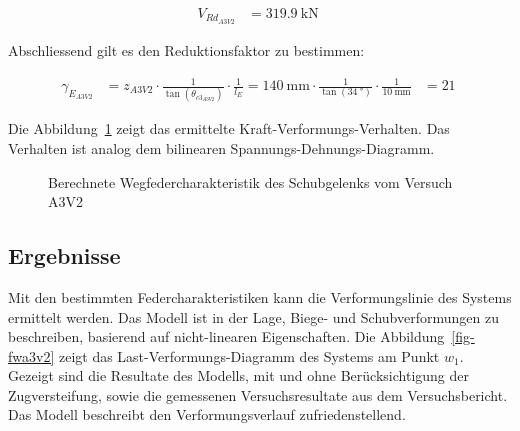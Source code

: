 \documentclass[
  11pt,
  letterpaper,
]{scrreprt}
\begin{document}
$$
\begin{aligned}
V_{Rd_{A3V2}} &= 319.9\ \mathrm{kN} \;
\end{aligned}
$$

Abschliessend gilt es den Reduktionsfaktor zu bestimmen:

$$
\begin{aligned}
\gamma_{E_{A3V2}} &= z_{A3V2} \cdot \frac{ 1 }{ \tan \left( \theta_{c3_{A3V2}} \right) } \cdot \frac{1} { l_{E} }  = 140\ \mathrm{mm} \cdot \frac{ 1 }{ \tan \left( 34\ \mathrm{°} \right) } \cdot \frac{1} { 10\ \mathrm{mm} } &= 21\  
\end{aligned}
$$

Die Abbildung~\ref{fig-wegfeder-schub-a3v2} zeigt das ermittelte
Kraft-Verformungs-Verhalten. Das Verhalten ist analog dem bilinearen
Spannungs-Dehnungs-Diagramm.

\begin{figure}[H]


\caption{\label{fig-wegfeder-schub-a3v2}Berechnete
Wegfedercharakteristik des Schubgelenks vom Versuch A3V2}

\end{figure}%

\subsection{Ergebnisse}\label{ergebnisse}

Mit den bestimmten Federcharakteristiken kann die Verformungslinie des
Systems ermittelt werden. Das Modell ist in der Lage, Biege- und
Schubverformungen zu beschreiben, basierend auf nicht-linearen
Eigenschaften. Die Abbildung~\ref{fig-fwa3v2} zeigt das
Last-Verformungs-Diagramm des Systems am Punkt \(w_1\). Gezeigt sind die
Resultate des Modells, mit und ohne Berücksichtigung der Zugversteifung,
sowie die gemessenen Versuchsresultate aus dem Versuchsbericht. Das
Modell beschreibt den Verformungsverlauf zufriedenstellend.
\end{document}
